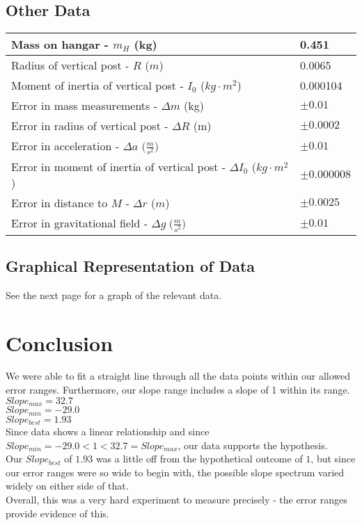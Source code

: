 \documentclass[letterpaper, fontsize=11pt]{scrartcl} %
\numberwithin{equation}{section} %
\numberwithin{figure}{section} %
\numberwithin{table}{section} %
\begin{document}
\subsection{Other Data}
\vspace{4mm}
{\footnotesize
\renewcommand{\arraystretch}{2}
    \begin{tabular}{ | l | p{4 cm} |}
    \hline
    Mass on hangar - $m_H$ (kg) & 0.451 \\ \hline
    Radius of vertical post - $R$ ($m$) & 0.0065 \\ \hline
    Moment of inertia of vertical post - $I_0$ ($kg \cdot m^2$) & 0.000104 \\ \hline
    Error in mass measurements - $\Delta{m}$ (kg) & $\pm{0.01}$ \\ \hline
    Error in radius of vertical post - $\Delta{R}$ (m) & $\pm{0.0002}$ \\ \hline
    Error in acceleration - $\Delta{a}$ $\bigg(\frac{m}{s^2}\bigg)$ & $\pm{0.01}$ \\ \hline
    Error in moment of inertia of vertical post - $\Delta{I_0}$ ($kg \cdot m^2$) & $\pm{0.000008}$ \\ \hline
    Error in distance to $M$ - $\Delta{r}$ ($m$) & $\pm{0.0025}$ \\ \hline
    Error in gravitational field - $\Delta{g} \;\bigg(\frac{m}{s^2}\bigg)$ & $\pm{0.01}$ \\ \hline
    \end{tabular}
}
\vspace{5mm}
\subsection{Graphical Representation of Data}
See the next page for a graph of the relevant data.
\pagebreak
\section{Conclusion}

We were able to fit a straight line through all the data points within our allowed error ranges. Furthermore, our slope range includes a slope of 1 within its range.\\

$Slope_{max} = 32.7$\\

$Slope_{min}= -29.0$\\

$Slope_{best}=1.93$\\

Since data shows a linear relationship and since $Slope_{min}=-29.0< 1 < 32.7 = Slope_{max}$, our data supports the hypothesis.\\

Our $Slope_{best}$ of $1.93$ was a little off from the hypothetical outcome of $1$, but since our error ranges were so wide to begin with, the possible slope spectrum varied widely on either side of that.\\

Overall, this was a very hard experiment to measure precisely - the error ranges provide evidence of this.
\end{document}
